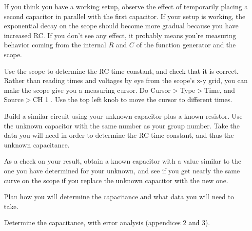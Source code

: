 If you think you have a working setup, observe the effect of
temporarily placing a second capacitor in parallel with the
first capacitor. If your setup is working, the exponential
decay on the scope should become more gradual because you
have increased RC. If you don't see any effect, it probably
means you're measuring behavior coming from the internal $R$
and $C$ of the function generator and the scope.

Use the scope to determine the RC time constant, and
check that it is correct.
Rather than reading times and voltages by eye from the scope's x-y grid, you can make
the scope give you a measuring cursor. Do Cursor$>$Type$>$Time, and Source$>$CH 1 . Use the top
left knob to move the cursor to different times.



Build a similar circuit using your unknown capacitor plus a
known resistor. Use the unknown capacitor with the same
number as your group number. Take the data you will need in
order to determine the RC time constant, and thus the
unknown capacitance.

As a check on your result, obtain a known capacitor with a
value similar to the one you have determined for your
unknown, and see if you get nearly the same curve on the
scope if you replace the unknown capacitor with the new one.

\prelab

\prelabquestion  Plan how you will determine the capacitance and what
data you will need to take.

\analysis

Determine the capacitance, with error analysis (appendices 2 and 3).
